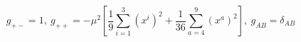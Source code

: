 \begin{equation}
g_{+-}=1,\ g_{++}
=-\mu^2\left[\frac{1}{9}\sum_{i=1}^3(x^i)^2+\frac{1}{36}
\sum_{a=4}^9(x^a)^2 \right],\ g_{AB}=\delta_{AB}
\end{equation}


